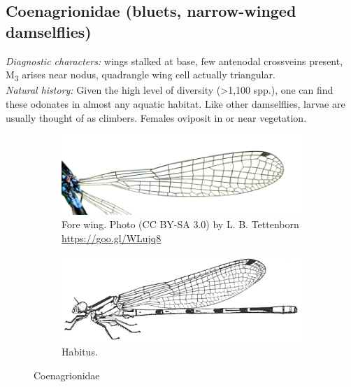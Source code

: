 \documentclass[letterpaper, 11pt]{article}
\begin{document}
\subsection{Coenagrionidae (bluets, narrow-winged damselflies)}
\noindent{}\textit{Diagnostic characters:} wings stalked at base, few antenodal crossveins present, \texorpdfstring{M\textsubscript{3}}{ }{ } arises near nodus, quadrangle wing cell actually triangular.\\

\noindent{}\textit{Natural history:} Given the high level of diversity (\textgreater1,100 spp.), one can find these odonates in almost any aquatic habitat. Like other damselflies, larvae are usually thought of as climbers. Females oviposit in or near vegetation.\\

\begin{figure}[ht!]
    \centering
    \begin{subfigure}[ht!]{0.45\textwidth}
        \includegraphics[width=\textwidth]{CoenagrionidWing}
        \caption{Fore wing. Photo (CC BY-SA 3.0) by L. B. Tettenborn \url{https://goo.gl/WLujq8}}
        \label{fig:coenwing}
    \end{subfigure}
    \hfill
    \begin{subfigure}[ht!]{0.5\textwidth}
        \includegraphics[width=\textwidth]{coenagBody.png}
        \caption{Habitus. \citep[Modified from Fig. 4:71a in][]{bhlitem126080usinger}}
        \label{fig:coenbody}
    \end{subfigure}
    \caption{Coenagrionidae}\label{fig:coenag}
\end{figure}
\end{document}
